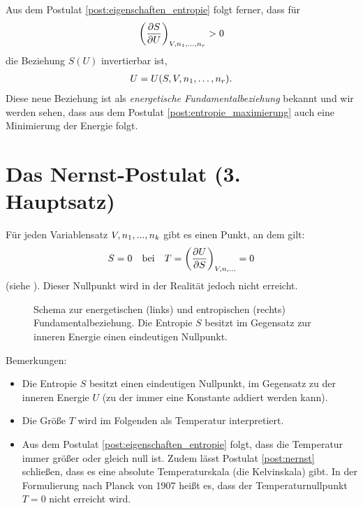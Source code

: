 Aus dem Postulat \ref{post:eigenschaften_entropie} folgt ferner, dass für
\begin{align*}
    \left(\frac{\partial S}{\partial U}\right)_{V,n_1, \dots ,n_r} > 0
\end{align*}
die Beziehung $S(U)$ invertierbar ist,
\begin{align}
    \label{eq:energetische fundamentalbeziehung}
    U = U(S,V,n_1, \dots,n_r).
\end{align}
Diese neue Beziehung ist als \emph{energetische Fundamentalbeziehung} bekannt und wir werden sehen, dass aus dem Postulat \ref{post:entropie_maximierung} auch eine Minimierung der Energie folgt.



\section{Das Nernst-Postulat (3. Hauptsatz)}



\begin{postulate}
    \label{post:nernst}
    Für jeden Variablensatz $V,n_1,...,n_k$ gibt es einen Punkt, an dem gilt:
    \begin{align}
        \label{eq:nernst_postulat}
        S = 0 \quad \text{bei} \quad T =\left(\frac{\partial U}{\partial S}\right)_{V,n,...}=0
    \end{align}
    (siehe ). Dieser Nullpunkt wird in der Realität jedoch nicht erreicht. 
\end{postulate}

\begin{figure}[H]
    \centering
    \tfigSchemaFundamentalbeziehung
    \caption{Schema zur energetischen (links) und entropischen (rechts) Fundamentalbeziehung. Die Entropie $S$ besitzt im Gegensatz zur inneren Energie einen eindeutigen Nullpunkt.  }
    \label{fig:SchemaFundamentalbeziehung}
\end{figure}

Bemerkungen:
\begin{itemize}
    \item Die Entropie $S$ besitzt einen eindeutigen Nullpunkt, im Gegensatz zu der inneren Energie $U$ (zu der immer eine Konstante addiert werden kann).
    \item Die Größe $T$ wird im Folgenden als Temperatur interpretiert.
    \item Aus dem Postulat \ref{post:eigenschaften_entropie} folgt, dass die Temperatur immer größer oder gleich null ist. Zudem lässt Postulat \ref{post:nernst} schließen, dass es eine absolute Temperaturskala (die Kelvinskala) gibt.
    In der Formulierung nach Planck von 1907 heißt es, dass der Temperaturnullpunkt $T=0$ nicht erreicht wird.
\end{itemize}




